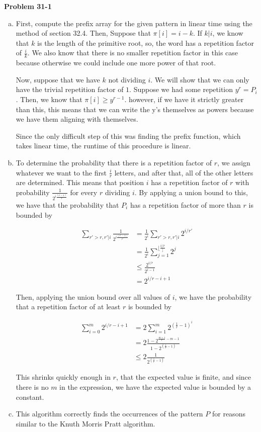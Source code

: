 \documentclass{article}
\begin{document}
\noindent\textbf{Problem 31-1}\\
\begin{enumerate}[a.]
\item
First, compute the prefix array for the given pattern in linear time using the method of section 32.4. Then, Suppose that $\pi[i] = i-k$. If $k | i$, we know that $k$ is the length of the primitive root, so, the word has a repetition factor of $\frac{i}{k}$. We also know that there is no smaller repetition factor in this case because otherwise we could include one more power of that root.

Now, suppose that we have $k$ not dividing $i$. We will show that we can only have the trivial repetition factor of $1$. Suppose we had some repetition $y^r = P_i$. Then, we know that $\pi[i] \ge y^{r-1}$. however, if we have it strictly greater than this, this means that we can write the y's themselves as powers because we have them aligning with themselves.

Since the only difficult step of this was finding the prefix function, which takes linear time, the runtime of this procedure is linear.
\item
To determine the probability that there is a repetition factor of $r$, we assign whatever we want to the first $\frac{i}{r}$ letters, and after that, all of the other letters are determined. This means that position $i$ has a repetition factor of $r$ with probability $\frac{1}{2^{i\frac{(r-1)}{r}}}$ for every $r$ dividing $i$. By applying a union bound to this, we have that the probability that $P_i$ has a repetition factor of more than $r$ is bounded by

\begin{align*}
\sum_{r'>r, r'|i} \frac{1}{2^{i\frac{(r'-1)}{r'}}}& = \frac{1}{2^i}\sum_{r'>r, r' |i}2^{i/r'}\\
&= \frac{1}{2^i} \sum_{j=1}^{\lfloor\frac{i/r}\rfloor}2^{j}\\
&\le \frac{2^{i/r}}{2^{i-1}}\\
&=2^{i/r -i +1}
\end{align*}

Then, applying the union bound over all values of $i$, we have the probability that a repetition factor of at least $r$ is bounded by

\begin{align*}
\sum_{i=0}^m 2^{i/r -i +1}& = 2 \sum_{i=1}^m 2^{(\frac{1}{r}-1)^i } \\
&= 2\frac{1-2^{\frac{m+1}{r}-m-1}}{1 - 2^{(\frac{1}{r}-1)}}\\
&\le 2\frac{1}{2^{(\frac{1}{r}-1)}}
\end{align*}

This shrinks quickly enough in $r$, that the expected value is finite, and since there is no $m$ in the expression, we have the expected value is bounded by a constant.
\item
This algorithm correctly finds the occurrences of the pattern $P$ for reasons similar to the Knuth Morris Pratt algorithm.
\end{enumerate}
\end{document}
